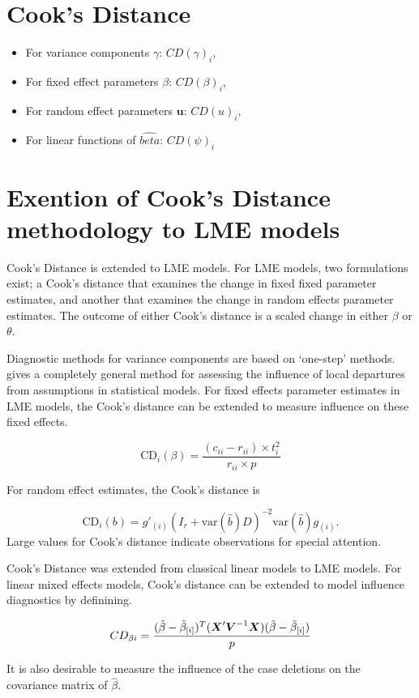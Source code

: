 \documentclass[12pt, a4paper]{article}
\begin{document}

\section{Cook's Distance}
\begin{itemize}
	\item For variance components $\gamma$: $CD(\gamma)_i$,
	\item For fixed effect parameters $\beta$: $CD(\beta)_i$,
	\item For random effect parameters $\boldsymbol{u}$: $CD(u)_i$,
	\item For linear functions of $\hat{beta}$: $CD(\psi)_i$
\end{itemize}

\section{Exention of Cook's Distance methodology to LME models}
 Cook's Distance is extended to LME models.  For LME models, two formulations exist; a Cook's distance that examines the change in fixed fixed parameter estimates, and another that examines the change in random effects parameter estimates. The outcome of either Cook's distance is a scaled change in either $\beta$ or $\theta$.

Diagnostic methods for variance components are based on `one-step' methods. \citet{cook86} gives a completely general method for assessing the influence of local departures from assumptions in statistical models. For fixed effects parameter estimates in LME models, the  Cook's distance can be extended to measure influence on these fixed effects.

\[
\mbox{CD}_{i}(\beta) = \frac{(c_{ii} - r_{ii}) \times t^2_{i}}{r_{ii} \times p}
\]

For random effect estimates, the  Cook's distance is

\[
\mbox{CD}_{i}(b) = g{\prime}_{(i)} (I_{r} + \mbox{var}(\hat{b})D)^{-2}\mbox{var}(\hat{b})g_{(i)}.
\]
Large values for Cook's distance indicate observations for special attention.

Cook's Distance was extended from classical linear models to LME models.  For linear mixed effects models, Cook's distance can be extended to model influence diagnostics by definining.

\[ CD_{\beta i} = {(\hat{\beta} - \hat{\beta}_{[i]})^{T}(\boldsymbol{X}^{\prime}\boldsymbol{V}^{-1}\boldsymbol{X}) (\hat{\beta} - \hat{\beta}_{[i]}) \over p}\]

It is also desirable to measure the influence of the case deletions on the covariance matrix of $\hat{\beta}$.

\end{document}
